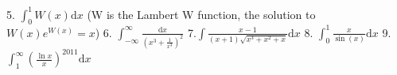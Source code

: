 \documentclass{article}
\newcommand{\dd}{\mathrm{d}}
\begin{document}
\begin{flushleft}
5. $\int_0^1 W(x) \dd x$ (W is the Lambert W function, the solution to $W(x)e^{W(x)}=x$) \newline  \newline \newline 
6. $\int_{-\infty}^{\infty} \frac{\dd x}{\left(x^3+\frac{1}{x^3}\right)^2}$ \newline  \newline \newline 
7.$\int \frac{x-1}{(x+1)\sqrt{x^3+x^2+x}} \dd x$ \newline \newline \newline
8. $\int_0^1 \frac{x}{\sin(x)} \dd x$ \newline  \newline \newline 
9. $\int_1^{\infty} \left(\frac{\ln{x}}{x}\right)^{2011} \dd x$\newline  \newline \newline 


\end{flushleft}
\end{document}
